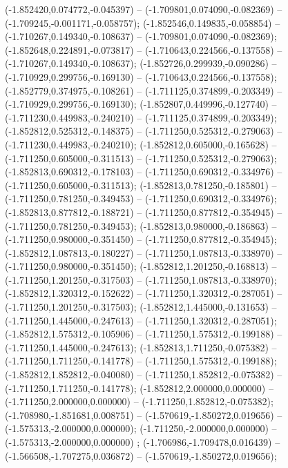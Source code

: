  (-1.852420,0.074772,-0.045397) -- (-1.709801,0.074090,-0.082369) -- (-1.709245,-0.001171,-0.058757);
 (-1.852546,0.149835,-0.058854) -- (-1.710267,0.149340,-0.108637) -- (-1.709801,0.074090,-0.082369);
 (-1.852648,0.224891,-0.073817) -- (-1.710643,0.224566,-0.137558) -- (-1.710267,0.149340,-0.108637);
 (-1.852726,0.299939,-0.090286) -- (-1.710929,0.299756,-0.169130) -- (-1.710643,0.224566,-0.137558);
 (-1.852779,0.374975,-0.108261) -- (-1.711125,0.374899,-0.203349) -- (-1.710929,0.299756,-0.169130);
 (-1.852807,0.449996,-0.127740) -- (-1.711230,0.449983,-0.240210) -- (-1.711125,0.374899,-0.203349);
 (-1.852812,0.525312,-0.148375) -- (-1.711250,0.525312,-0.279063) -- (-1.711230,0.449983,-0.240210);
 (-1.852812,0.605000,-0.165628) -- (-1.711250,0.605000,-0.311513) -- (-1.711250,0.525312,-0.279063);
 (-1.852813,0.690312,-0.178103) -- (-1.711250,0.690312,-0.334976) -- (-1.711250,0.605000,-0.311513);
 (-1.852813,0.781250,-0.185801) -- (-1.711250,0.781250,-0.349453) -- (-1.711250,0.690312,-0.334976);
 (-1.852813,0.877812,-0.188721) -- (-1.711250,0.877812,-0.354945) -- (-1.711250,0.781250,-0.349453);
 (-1.852813,0.980000,-0.186863) -- (-1.711250,0.980000,-0.351450) -- (-1.711250,0.877812,-0.354945);
 (-1.852812,1.087813,-0.180227) -- (-1.711250,1.087813,-0.338970) -- (-1.711250,0.980000,-0.351450);
 (-1.852812,1.201250,-0.168813) -- (-1.711250,1.201250,-0.317503) -- (-1.711250,1.087813,-0.338970);
 (-1.852812,1.320312,-0.152622) -- (-1.711250,1.320312,-0.287051) -- (-1.711250,1.201250,-0.317503);
 (-1.852812,1.445000,-0.131653) -- (-1.711250,1.445000,-0.247613) -- (-1.711250,1.320312,-0.287051);
 (-1.852812,1.575312,-0.105906) -- (-1.711250,1.575312,-0.199188) -- (-1.711250,1.445000,-0.247613);
 (-1.852813,1.711250,-0.075382) -- (-1.711250,1.711250,-0.141778) -- (-1.711250,1.575312,-0.199188);
 (-1.852812,1.852812,-0.040080) -- (-1.711250,1.852812,-0.075382) -- (-1.711250,1.711250,-0.141778);
 (-1.852812,2.000000,0.000000) -- (-1.711250,2.000000,0.000000) -- (-1.711250,1.852812,-0.075382);
 (-1.708980,-1.851681,0.008751) -- (-1.570619,-1.850272,0.019656) -- (-1.575313,-2.000000,0.000000);
 (-1.711250,-2.000000,0.000000) -- (-1.575313,-2.000000,0.000000) ;
 (-1.706986,-1.709478,0.016439) -- (-1.566508,-1.707275,0.036872) -- (-1.570619,-1.850272,0.019656);
